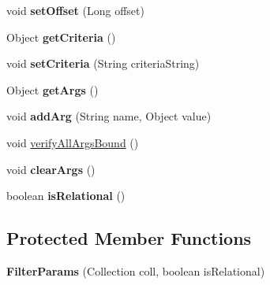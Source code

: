 \begin{DoxyCompactItemize}
void {\bfseries set\+Offset} (Long offset)
\item 
\mbox{\label{classcom_1_1mysql_1_1cj_1_1xdevapi_1_1_filter_params_a298c93b71ac0764ce416f09aa090442f}} 
Object {\bfseries get\+Criteria} ()
\item 
\mbox{\label{classcom_1_1mysql_1_1cj_1_1xdevapi_1_1_filter_params_aa0ac8db4a35c529635ad8342376e8cc1}} 
void {\bfseries set\+Criteria} (String criteria\+String)
\item 
\mbox{\label{classcom_1_1mysql_1_1cj_1_1xdevapi_1_1_filter_params_a271d4ea9712402151234e5572a6aa09b}} 
Object {\bfseries get\+Args} ()
\item 
\mbox{\label{classcom_1_1mysql_1_1cj_1_1xdevapi_1_1_filter_params_a14711ecd2e838e02df5d7ec3fbb530bc}} 
void {\bfseries add\+Arg} (String name, Object value)
\item 
void \mbox{\hyperlink{classcom_1_1mysql_1_1cj_1_1xdevapi_1_1_filter_params_a404c1357e69a9ae03bcc221bed29701e}{verify\+All\+Args\+Bound}} ()
\item 
\mbox{\label{classcom_1_1mysql_1_1cj_1_1xdevapi_1_1_filter_params_a44893f6e83b75a7251db6fd6e6e6354a}} 
void {\bfseries clear\+Args} ()
\item 
\mbox{\label{classcom_1_1mysql_1_1cj_1_1xdevapi_1_1_filter_params_a6138eacef0c1d882b002d26ad5e84978}} 
boolean {\bfseries is\+Relational} ()
\end{DoxyCompactItemize}
\subsection*{Protected Member Functions}
\begin{DoxyCompactItemize}
\item 
\mbox{\label{classcom_1_1mysql_1_1cj_1_1xdevapi_1_1_filter_params_a6408bc660a0f6eb4e982444537c9130e}} 
{\bfseries Filter\+Params} (Collection coll, boolean is\+Relational)
\end{DoxyCompactItemize}
